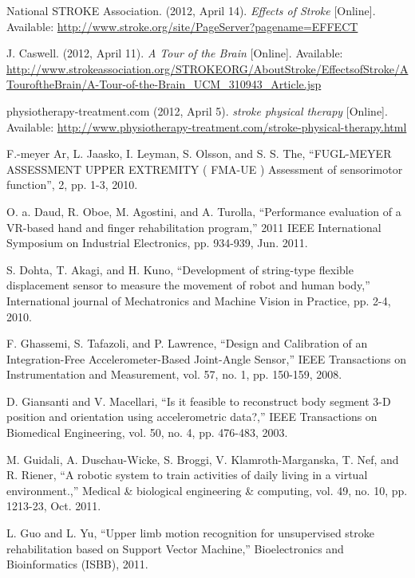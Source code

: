 \documentclass[journal]{IEEEtran}
\begin{document}
\begin{thebibliography}{1} 
  
 National STROKE Association. (2012, April 14). \emph{Effects of Stroke} [Online]. Available: \url{http://www.stroke.org/site/PageServer?pagename=EFFECT}

 J. Caswell. (2012, April 11). \emph{A Tour of the Brain} [Online]. Available: \url{http://www.strokeassociation.org/STROKEORG/AboutStroke/EffectsofStroke/ATouroftheBrain/A-Tour-of-the-Brain_UCM_310943_Article.jsp}

 physiotherapy-treatment.com (2012, April 5). \emph{stroke physical therapy} [Online]. Available: \url{http://www.physiotherapy-treatment.com/stroke-physical-therapy.html}

 F.-meyer Ar, L. Jaasko, I. Leyman, S. Olsson, and S. S. The, “FUGL-MEYER ASSESSMENT UPPER EXTREMITY ( FMA-UE ) Assessment of sensorimotor function”, 2, pp. 1-3, 2010.

 O. a. Daud, R. Oboe, M. Agostini, and A. Turolla, “Performance evaluation of a VR-based hand and finger rehabilitation program,” 2011 IEEE International Symposium on Industrial Electronics, pp. 934-939, Jun. 2011.

 S. Dohta, T. Akagi, and H. Kuno, “Development of string-type flexible displacement sensor to measure the movement of robot and human body,” International journal of Mechatronics and Machine Vision in Practice, pp. 2-4, 2010.

 F. Ghassemi, S. Tafazoli, and P. Lawrence, “Design and Calibration of an Integration-Free Accelerometer-Based Joint-Angle Sensor,” IEEE Transactions on Instrumentation and Measurement, vol. 57, no. 1, pp. 150-159, 2008.

 D. Giansanti and V. Macellari, “Is it feasible to reconstruct body segment 3-D position and orientation using accelerometric data?,” IEEE Transactions on Biomedical Engineering, vol. 50, no. 4, pp. 476-483, 2003.

 M. Guidali, A. Duschau-Wicke, S. Broggi, V. Klamroth-Marganska, T. Nef, and R. Riener, “A robotic system to train activities of daily living in a virtual environment.,” Medical \& biological engineering \& computing, vol. 49, no. 10, pp. 1213-23, Oct. 2011.

 L. Guo and L. Yu, “Upper limb motion recognition for unsupervised stroke rehabilitation based on Support Vector Machine,” Bioelectronics and Bioinformatics (ISBB), 2011.


\end{thebibliography}
\end{document}
